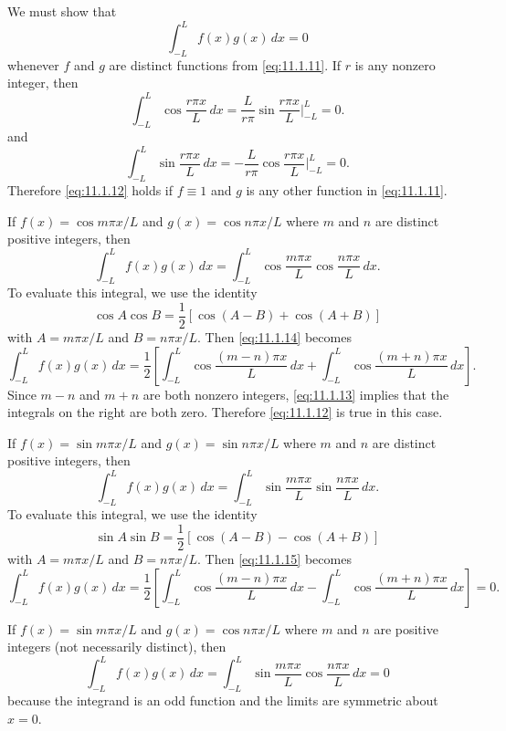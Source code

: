 \begin{solution}
We must show that
\begin{equation} \label{eq:11.1.12}
\int_{-L}^L f(x)g(x)\,dx=0
\end{equation}
whenever $f$ and $g$ are distinct functions from \eqref{eq:11.1.11}.
If $r$ is any nonzero integer, then
\begin{equation} \label{eq:11.1.13}
\int_{-L}^L\cos\frac{r\pi x}{L}\,dx
=\frac{L}{r\pi}\sin\frac{r\pi x}{L}\bigg|_{-L}^L=0.
\end{equation}
and
\[
\int_{-L}^L\sin\frac{r\pi x}{L}\,dx
=-\frac{L}{r\pi}\cos\frac{r\pi x}{L}\bigg|_{-L}^L=0.
\]
Therefore \eqref{eq:11.1.12} holds  if $f\equiv1$
and $g$ is any other function in \eqref{eq:11.1.11}.

If $f(x)=\cos m\pi x/L$ and $g(x)=\cos n\pi x/L$ where $m$
and $n$ are distinct positive integers, then
\begin{equation} \label{eq:11.1.14}
\int_{-L}^L f(x)g(x)\,dx=\int_{-L}^L\cos\frac{m\pi x}{L}
\cos\frac{n\pi x}{L}\,dx.
\end{equation}
To evaluate this integral, we use the identity
\[
\cos A\cos B=\frac{1}{2}[\cos(A-B)+\cos(A+B)]
\]
with $A=m\pi x/L$ and $B=n\pi x/L$.  Then \eqref{eq:11.1.14} becomes
\[
\int_{-L}^L
f(x)g(x)\,dx=\frac{1}{2}\left[\int_{-L}^L\cos\frac{(m-n)\pi x}{L}\,dx
+\int_{-L}^L\cos\frac{(m+n)\pi x}{L}\,dx\right].
\]
Since $m-n$ and $m+n$ are both nonzero integers, \eqref{eq:11.1.13}
implies that the  integrals on the right are both zero. Therefore
 \eqref{eq:11.1.12} is true  in this case.


If $f(x)=\sin m\pi x/L$ and $g(x)=\sin n\pi x/L$ where $m$
and $n$ are distinct positive integers, then
\begin{equation} \label{eq:11.1.15}
\int_{-L}^L f(x)g(x)\,dx=\int_{-L}^L\sin\frac{m\pi x}{L}
\sin\frac{n\pi x}{L}\,dx.
\end{equation}
To evaluate this integral, we use the  identity
\[
\sin A\sin B=\frac{1}{2}[\cos(A-B)-\cos(A+B)]
\]
with $A=m\pi x/L$ and $B=n\pi x/L$.  Then \eqref{eq:11.1.15} becomes
\[
\int_{-L}^L
f(x)g(x)\,dx=\frac{1}{2}\left[\int_{-L}^L\cos\frac{(m-n)\pi x}{L}\,dx
-\int_{-L}^L\cos\frac{(m+n)\pi x}{L}\,dx\right]=0.
\]


If $f(x)=\sin m\pi x/L$ and $g(x)=\cos n\pi x/L$ where $m$
and $n$ are   positive integers (not necessarily distinct),
then
\[
\int_{-L}^L f(x)g(x)\,dx=\int_{-L}^L\sin\frac{m\pi x}{L}
\cos\frac{n\pi x}{L}\,dx=0
\]
because the integrand is an odd function and the limits are symmetric
about $x=0$.
\end{solution}


